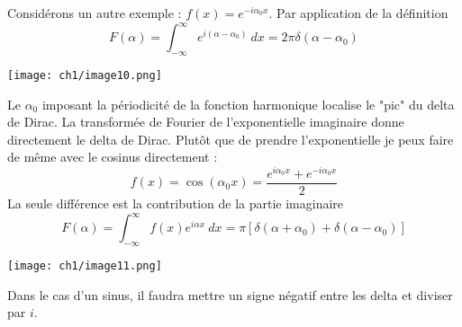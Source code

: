 Considérons un autre exemple : $f(x) = e^{-i\alpha_0x}$. Par application de la définition
\begin{equation}
F(\alpha) = \int_{-\infty}^\infty e^{i(\alpha-\alpha_0)}\ dx = 2\pi\delta(\alpha-\alpha_0)
\end{equation}
\begin{center}
\texttt{[image: ch1/image10.png]}
\end{center}
Le $\alpha_0$ imposant la périodicité de la fonction harmonique localise le "pic" du delta 
de Dirac. La transformée de Fourier de l'exponentielle imaginaire donne directement le delta 
de Dirac. Plutôt que de prendre l'exponentielle je peux faire de même avec le cosinus directement :
\begin{equation}
f(x) = \cos(\alpha_0x) = \frac{e^{i\alpha_0x}+e^{-i\alpha_0x}}{2}
\end{equation}
La seule différence est la contribution de la partie imaginaire
\begin{equation}
F(\alpha) = \int_{-\infty}^\infty f(x)e^{i\alpha x}\ dx = \pi[\delta(\alpha+\alpha_0)+\delta(\alpha
-\alpha_0)]
\end{equation}
\begin{center}
\texttt{[image: ch1/image11.png]}
\end{center}
Dans le cas d'un sinus, il faudra mettre un signe négatif entre les delta et diviser par $i$.\\

